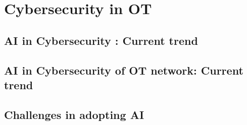 \section{Cybersecurity in OT}

\subsection{AI in Cybersecurity : Current trend}
\subsection{AI in Cybersecurity of OT network: Current trend}

\subsection{Challenges in adopting AI}

